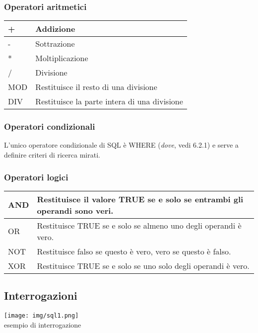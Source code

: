 \documentclass[a4paper]{article}
\begin{document}
\subsubsection{Operatori aritmetici}
\begin{tabularx}{350pt}{|l|X|}
  \hline
  + & Addizione\\
  \hline
  - & Sottrazione\\
  \hline
  * & Moltiplicazione\\
  \hline
  / & Divisione\\
  \hline
  MOD & Restituisce il resto di una divisione\\
  \hline
  DIV & Restituisce la parte intera di una divisione\\
  \hline
\end{tabularx}

\subsubsection{Operatori condizionali}
L'unico operatore condizionale di SQL è WHERE (\emph{dove}, vedi 6.2.1) e serve a definire criteri di ricerca mirati.

\subsubsection{Operatori logici}
\begin{tabularx}{350pt}{|l|X|}
  \hline
  AND & Restituisce il valore TRUE se e solo se entrambi gli operandi sono veri.\\
  \hline
  OR & Restituisce TRUE se e solo se almeno uno degli operandi è vero.\\
  \hline
  NOT & Restituisce falso se questo è vero, vero se questo è falso.\\
  \hline
  XOR & Restituisce TRUE se e solo se uno solo degli operandi è vero.\\
  \hline
\end{tabularx}

\subsection{Interrogazioni}
\begin{center}
      \texttt{[image: img/sql1.png]}\\
      esempio di interrogazione
\end{center}
\end{document}

